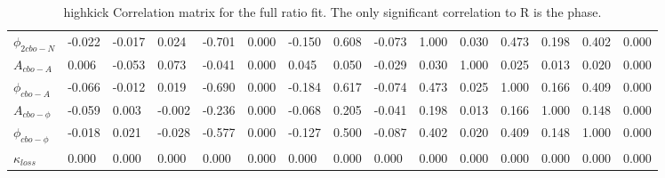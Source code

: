 \begin{landscape}
\begin{table}[]
\begin{tabular*}{\linewidth}{@{\extracolsep{\fill}}lLBLLLLLLLLLLLL}
$\phi_{2cbo-N}$    & -0.022 & -0.017 & 0.024 & -0.701 & 0.000 & -0.150 & 0.608 & -0.073 & 1.000 & 0.030 & 0.473 & 0.198 & 0.402 & 0.000  \\
$A_{cbo-A}$        & 0.006 & -0.053 & 0.073 & -0.041 & 0.000 & 0.045 & 0.050 & -0.029 & 0.030 & 1.000 & 0.025 & 0.013 & 0.020 & 0.000  \\
$\phi_{cbo-A}$     & -0.066 & -0.012 & 0.019 & -0.690 & 0.000 & -0.184 & 0.617 & -0.074 & 0.473 & 0.025 & 1.000 & 0.166 & 0.409 & 0.000  \\
$A_{cbo-\phi}$     & -0.059 & 0.003 & -0.002 & -0.236 & 0.000 & -0.068 & 0.205 & -0.041 & 0.198 & 0.013 & 0.166 & 1.000 & 0.148 & 0.000  \\
$\phi_{cbo-\phi}$  & -0.018 & 0.021 & -0.028 & -0.577 & 0.000 & -0.127 & 0.500 & -0.087 & 0.402 & 0.020 & 0.409 & 0.148 & 1.000 & 0.000  \\
$\kappa_{loss}$    & 0.000 & 0.000 & 0.000 & 0.000 & 0.000 & 0.000 & 0.000 & 0.000 & 0.000 & 0.000 & 0.000 & 0.000 & 0.000 & 0.000  \\
  \bottomrule
\end{tabular*}
\caption[]{highkick Correlation matrix for the full ratio fit. The only significant correlation to R is the \gmtwo phase.}
\label{Tab:CorrMat}
\end{table}
\end{landscape}

